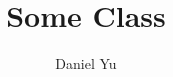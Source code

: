 \documentclass[a4paper]{article}
\title{\Huge{Some Class}}
\author{\huge{Daniel Yu}}
\date{}
\begin{document}
\maketitle
\newpage%
\tableofcontents
\pagebreak
  
\end{document}

